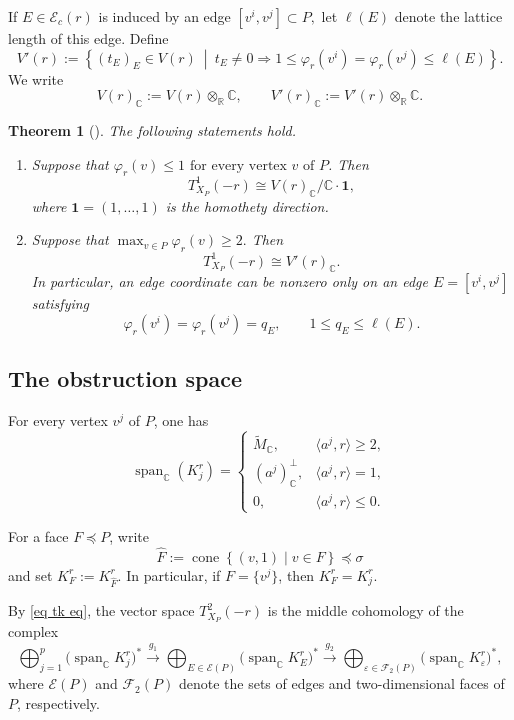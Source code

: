 \documentclass[11pt]{amsart}
\numberwithin{equation}{section}
\theoremstyle{plain}
\newtheorem{theorem}{Theorem}[section]
\theoremstyle{definition}
\newcommand{\0}{$0$-mutable}
\newcommand{\RR}{\ensuremath{\mathbb{R}}}
\newcommand{\CC}{\ensuremath{\mathbb{C}}}
\renewcommand{\1}{$1$-rigid}
\renewcommand{\0}{$0$-mutable}
\begin{document}
If \(E\in\mathcal E_c(r)\) is induced by an edge
$
[v^i,v^j]\subset P,
$
let \(\ell(E)\) denote the lattice length of this edge. Define
\[
V'(r)
:=
\left\{
(t_E)_E\in V(r)
\ \middle|\
t_E\neq0
\Longrightarrow
1\leq
\varphi_r(v^i)
=
\varphi_r(v^j)
\leq\ell(E)
\right\}.
\]
We write
\[
V(r)_{\CC}:=V(r)\otimes_{\RR}\CC,
\qquad
V'(r)_{\CC}:=V'(r)\otimes_{\RR}\CC.
\]

\begin{theorem}[{\cite[Theorem~4.1]{Alt00}}]
\label{th Altmann T1}
The following statements hold.
\begin{enumerate}
\item Suppose that
$\varphi_r(v)\leq1$
$\text{for every vertex }v\text{ of }P$.
Then
\[
T^1_{X_P}(-r)
\cong
V(r)_{\CC}/\CC\cdot \mathbf 1,
\]
where
$
\mathbf 1=(1,\ldots,1)
$
is the homothety direction.

\item Suppose that
$
\max_{v\in P}\varphi_r(v)\geq2.
$
Then
\[
T^1_{X_P}(-r)
\cong
V'(r)_{\CC}.
\]
In particular, an edge coordinate can be nonzero only on an edge
\(E=[v^i,v^j]\) satisfying
\[
\varphi_r(v^i)
=
\varphi_r(v^j)
=
q_E,
\qquad
1\leq q_E\leq\ell(E).
\]
\end{enumerate}
\end{theorem}


\subsection{The obstruction space}

For every vertex \(v^j\) of \(P\), one has
\begin{equation}
\label{span-possibilities}
\operatorname{span}_{\CC}(K_j^r)
=
\begin{cases}
\widetilde M_{\CC},
&
\langle a^j,r\rangle\geq2,
\\[2mm]
(a^j)^\perp_{\CC},
&
\langle a^j,r\rangle=1,
\\[2mm]
0,
&
\langle a^j,r\rangle\leq0.
\end{cases}
\end{equation}

For a face \(F\preceq P\), write
\begin{equation}\label{eq hat}
\widehat F
:=
\operatorname{cone}
\left\{
(v,1)\mid v\in F
\right\}
\preceq\sigma
\end{equation}
and set
$
K_F^r:=K_{\widehat F}^r.
$
In particular, if \(F=\{v^j\}\), then
$
K_F^r=K_j^r.
$

By \eqref{eq tk eq}, the vector space \(T^2_{X_P}(-r)\) is the middle
cohomology of the complex
\begin{equation}
\label{eq t2 complex}
\bigoplus_{j=1}^p
\bigl(\operatorname{span}_{\CC}K_j^r\bigr)^*
\xrightarrow{\,g_1\,}
\bigoplus_{E\in\mathcal E(P)}
\bigl(\operatorname{span}_{\CC}K_E^r\bigr)^*
\xrightarrow{\,g_2\,}
\bigoplus_{\varepsilon\in\mathcal F_2(P)}
\bigl(\operatorname{span}_{\CC}K_\varepsilon^r\bigr)^*,
\end{equation}
where \(\mathcal E(P)\) and \(\mathcal F_2(P)\) denote the sets of
edges and two-dimensional faces of \(P\), respectively.
\end{document}
